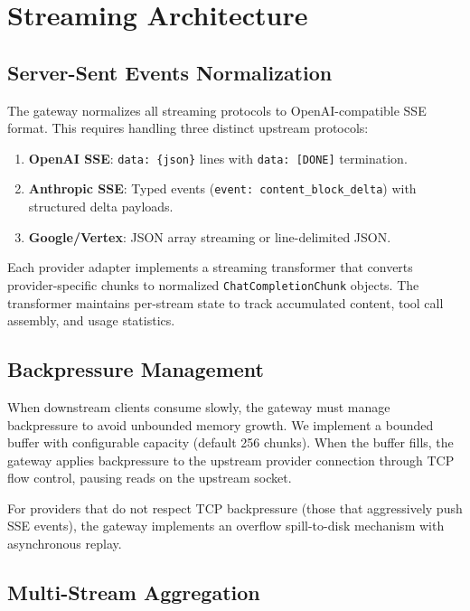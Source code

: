 \section{Streaming Architecture}

\label{sec:streaming}

\subsection{Server-Sent Events Normalization}

The gateway normalizes all streaming protocols to OpenAI-compatible SSE format. This requires handling three distinct upstream protocols:

\begin{enumerate}[leftmargin=*]
    \item \textbf{OpenAI SSE}: \texttt{data: \{json\}} lines with \texttt{data: [DONE]} termination.
    \item \textbf{Anthropic SSE}: Typed events (\texttt{event: content\_block\_delta}) with structured delta payloads.
    \item \textbf{Google/Vertex}: JSON array streaming or line-delimited JSON.
\end{enumerate}

Each provider adapter implements a streaming transformer that converts provider-specific chunks to normalized \texttt{ChatCompletionChunk} objects. The transformer maintains per-stream state to track accumulated content, tool call assembly, and usage statistics.

\subsection{Backpressure Management}

When downstream clients consume slowly, the gateway must manage backpressure to avoid unbounded memory growth. We implement a bounded buffer with configurable capacity (default 256 chunks). When the buffer fills, the gateway applies backpressure to the upstream provider connection through TCP flow control, pausing reads on the upstream socket.

For providers that do not respect TCP backpressure (those that aggressively push SSE events), the gateway implements an overflow spill-to-disk mechanism with asynchronous replay.

\subsection{Multi-Stream Aggregation}

